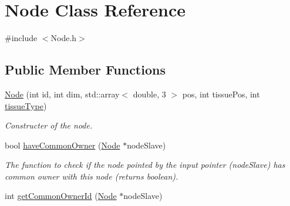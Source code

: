 \hypertarget{classNode}{}\section{Node Class Reference}
\label{classNode}


{\ttfamily \#include $<$Node.\+h$>$}

\subsection*{Public Member Functions}
\begin{DoxyCompactItemize}
\item 
\hypertarget{classNode_a4cb4e49e312b20b6d1b11e15d6a8a0e3}{}\hyperlink{classNode_a4cb4e49e312b20b6d1b11e15d6a8a0e3}{Node} (int id, int dim, std\+::array$<$ double, 3 $>$ pos, int tissue\+Pos, int \hyperlink{classNode_ae621097f98f1d33d283cf65a0a02d29a}{tissue\+Type})\label{classNode_a4cb4e49e312b20b6d1b11e15d6a8a0e3}

\begin{DoxyCompactList}\small\item\em Constructer of the node. \end{DoxyCompactList}\item 
\hypertarget{classNode_ab165125d2f0e60b9030468a4152c3ccb}{}bool \hyperlink{classNode_ab165125d2f0e60b9030468a4152c3ccb}{have\+Common\+Owner} (\hyperlink{classNode}{Node} $\ast$node\+Slave)\label{classNode_ab165125d2f0e60b9030468a4152c3ccb}

\begin{DoxyCompactList}\small\item\em The function to check if the node pointed by the input pointer (node\+Slave) has common owner with this node (returns boolean). \end{DoxyCompactList}\item 
\hypertarget{classNode_a52d23c3e39f6de623ed0aad9bc225c14}{}int \hyperlink{classNode_a52d23c3e39f6de623ed0aad9bc225c14}{get\+Common\+Owner\+Id} (\hyperlink{classNode}{Node} $\ast$node\+Slave)\label{classNode_a52d23c3e39f6de623ed0aad9bc225c14}


\end{DoxyCompactItemize}
